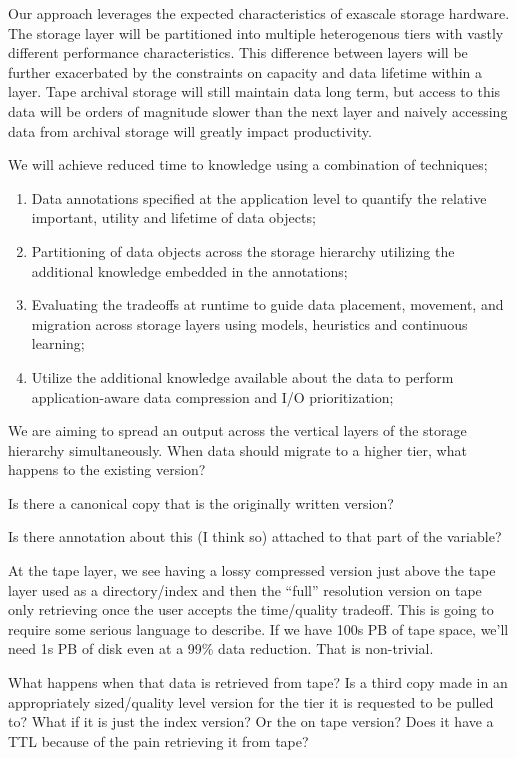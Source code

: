 Our approach leverages the expected characteristics of exascale storage
hardware. The storage layer will be partitioned into multiple heterogenous
tiers with vastly different performance characteristics. This difference
between layers will be further exacerbated by the constraints on capacity
and data lifetime within a layer. Tape archival storage will still maintain
data long term, but access to this data will be orders of magnitude slower
than the next layer and naively accessing data from archival storage will
greatly impact productivity. 

We will achieve reduced time to knowledge using a combination of techniques;
\begin{enumerate}
\item Data annotations specified at the application level to quantify the
  relative important, utility and lifetime of data objects;
\item Partitioning of data objects across the storage hierarchy utilizing
  the additional knowledge embedded in the annotations;
\item Evaluating the tradeoffs at runtime to guide data placement, movement,
  and migration across storage layers using models, heuristics and continuous
  learning;
\item Utilize the additional knowledge available about the data to perform
  application-aware data compression and I/O prioritization;
\end{enumerate}

We are aiming to spread an output across the vertical layers of the storage
hierarchy simultaneously.  When data should migrate to a higher tier, what
happens to the existing version?

Is there a canonical copy that is the originally written version?

Is there annotation about this (I think so) attached to that part of the variable?

At the tape layer, we see having a lossy compressed version just above the tape
layer used as a directory/index and then the ``full'' resolution version on
tape only retrieving once the user accepts the time/quality tradeoff. This is
going to require some serious language to describe. If we have 100s PB of tape
space, we'll need 1s PB of disk even at a 99\% data reduction. That is
non-trivial.

What happens when that data is retrieved from tape? Is a third copy made in an
appropriately sized/quality level version for the tier it is requested to be
pulled to? What if it is just the index version? Or the on tape version? Does
it have a TTL because of the pain retrieving it from tape?

